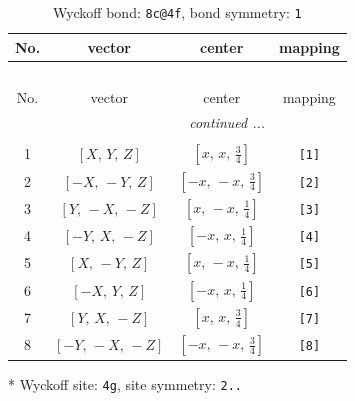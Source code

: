 \documentclass[fleqn,8pt]{jsarticle}
\begin{document}
\renewcommand{\arraystretch}{1.2}
\begin{longtable}{cccc}
\caption{Wyckoff bond: {\tt 8c@4f}, bond symmetry: {\tt 1}}
 \\
 \hline \hline
No. & vector & center & mapping \\ \hline \endfirsthead

\multicolumn{3}{l}{\tablename\ \thetable{}} \\
 \hline \hline
No. & vector & center & mapping \\ \hline \endhead

 \hline \hline
\multicolumn{3}{r}{\footnotesize\it continued ...} \\ \endfoot

 \hline \hline
\multicolumn{3}{r}{} \\ \endlastfoot

1 & $\left[ X,\, Y,\, Z \right]$ & $\left[ x,\, x,\, \frac{3}{4} \right]$ & {\tt [1]} \\ \hline
2 & $\left[ - X,\, - Y,\, Z \right]$ & $\left[ - x,\, - x,\, \frac{3}{4} \right]$ & {\tt [2]} \\ \hline
3 & $\left[ Y,\, - X,\, - Z \right]$ & $\left[ x,\, - x,\, \frac{1}{4} \right]$ & {\tt [3]} \\ \hline
4 & $\left[ - Y,\, X,\, - Z \right]$ & $\left[ - x,\, x,\, \frac{1}{4} \right]$ & {\tt [4]} \\ \hline
5 & $\left[ X,\, - Y,\, Z \right]$ & $\left[ x,\, - x,\, \frac{1}{4} \right]$ & {\tt [5]} \\ \hline
6 & $\left[ - X,\, Y,\, Z \right]$ & $\left[ - x,\, x,\, \frac{1}{4} \right]$ & {\tt [6]} \\ \hline
7 & $\left[ Y,\, X,\, - Z \right]$ & $\left[ x,\, x,\, \frac{3}{4} \right]$ & {\tt [7]} \\ \hline
8 & $\left[ - Y,\, - X,\, - Z \right]$ & $\left[ - x,\, - x,\, \frac{3}{4} \right]$ & {\tt [8]} \\
\end{longtable}
* Wyckoff site: {\tt 4g}, site symmetry: {\tt 2..}
\renewcommand{\arraystretch}{1.2}
\end{document}
